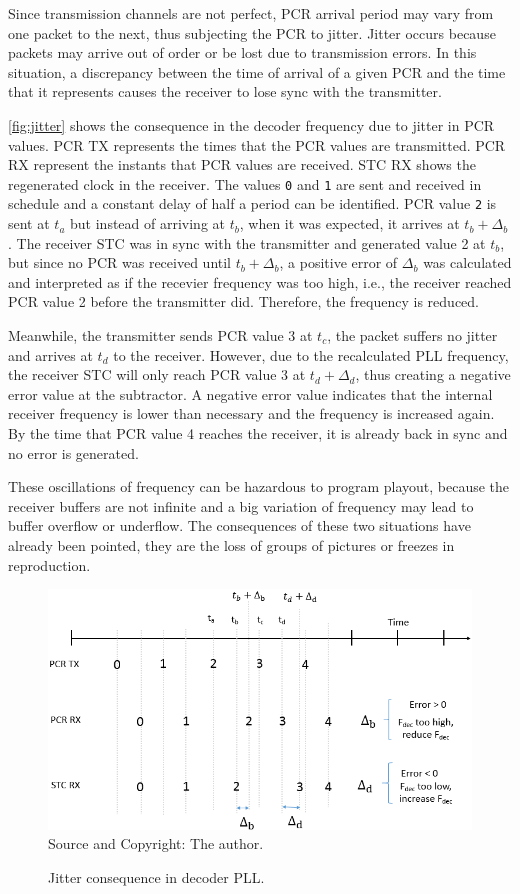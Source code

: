 \documentclass[
	12pt,				%
	openright,			%
	twoside,			%
	a4paper,			%
	brazil,
	french,				%
	english
	]{abntex2}
\begin{document}
Since transmission channels are not perfect, PCR arrival period may vary from one packet to the next, thus subjecting the PCR to jitter. Jitter occurs because packets may arrive out of order or be lost due to transmission errors. In this situation, a discrepancy between the time of arrival of a given PCR and the time that it represents causes the receiver to lose sync with the transmitter.

\autoref{fig:jitter} shows the consequence in the decoder frequency due to jitter in PCR values. PCR TX represents the times that the PCR values are transmitted. PCR RX represent the instants that PCR values are received. STC RX shows the regenerated clock in the receiver. The values \texttt{0} and \texttt{1} are sent and received in schedule and a constant delay of half a period can be identified. PCR value \texttt{2} is sent at $t_a$ but instead of arriving at $t_b$, when it was expected, it arrives at $t_b + \Delta_b$. The receiver STC was in sync with the transmitter and generated value 2 at $t_b$, but since no PCR was received until $t_b + \Delta_b$, a positive error of $\Delta_b$ was calculated and interpreted as if the recevier frequency was too high, i.e., the receiver reached PCR value 2 before the transmitter did. Therefore, the frequency is reduced.

Meanwhile, the transmitter sends PCR value 3 at $t_c$, the packet suffers no jitter and arrives at $t_d$ to the receiver. However, due to the recalculated PLL frequency, the receiver STC will only reach PCR value 3 at $t_d + \Delta_d$, thus creating a negative error value at the subtractor. A negative error value indicates that the internal receiver frequency is lower than necessary and the frequency is increased again. By the time that PCR value 4 reaches the receiver, it is already back in sync and no error is generated.

These oscillations of frequency can be hazardous to program playout, because the receiver buffers are not infinite and a big variation of frequency may lead to buffer overflow or underflow. The consequences of these two situations have already been pointed, they are the loss of groups of pictures or freezes in reproduction.

\begin{figure}[!hb]
\centering
\caption{Jitter consequence in decoder PLL.}
\includegraphics[width=0.8\linewidth]{figuras/jitter.png}
\\Source and Copyright: The author.
\label{fig:jitter}
\end{figure}
\end{document}
